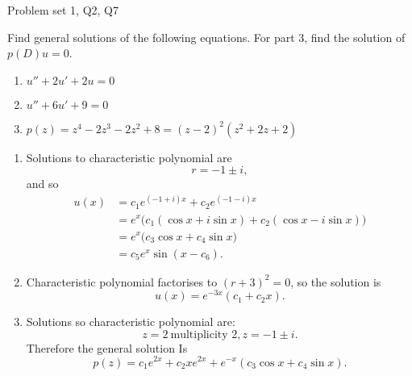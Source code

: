 \begin{problem}{Problem set 1, Q2, Q7}{}
        

    Find general solutions of the following equations. For part 3, find the solution of $p(D)u = 0$.
    \begin{enumerate}
        \item $u''+ 2u' + 2u = 0$
        \item $u'' + 6u' + 9 = 0$
        \item $p(z) = z^4 - 2z^3 - 2z^2 + 8
            = (z - 2)^2 (z^2 + 2z + 2)$
    \end{enumerate}

    \tcblower
    
    \begin{enumerate}
        \item Solutions to characteristic polynomial are
            $$ r = -1 \pm i , $$
        and so
            \begin{align*}
                u(x) &= c_1 e^{(-1 + i)x} + c_2 e^{(-1 - i)x} \\
                &= e^x \biggl( 
                    c_1 (\cos x + i\sin x) 
                    + c_2 (\cos x - i\sin x) \biggr) \\
                &= e^x \biggl( c_3 \cos x
                    + c_4 \sin x \biggr) \\
                &= c_5 e^x \sin(x - c_6) .
            \end{align*}
        \item Characteristic polynomial factorises to $(r + 3)^2 = 0$, so the solution is
            $$ u(x) = e^{-3x} (c_1 + c_2 x) . $$
        \item Solutions so characteristic polynomial are:
            $$ z = 2 \ \text{multiplicity $2$}, z = -1 \pm i . $$
        Therefore the general solution Is
            $$ p(z) = c_1 e^{2x} + c_2 x e^{2x}
                + e^{-x} (c_3 \cos x + c_4 \sin x) . $$
    \end{enumerate}

\end{problem}

